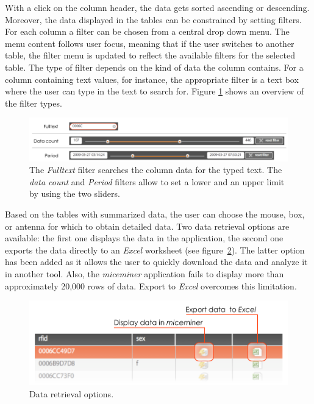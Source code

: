 With a click on the column header, the data gets sorted ascending or descending. Moreover, the data displayed in the tables can be constrained by setting filters. For each column a filter can be chosen from a central drop down menu. The menu content follows user focus, meaning that if the user switches to another table, the filter menu is updated to reflect the available filters for the selected table. The type of filter depends on the kind of data the column contains. For a column containing text values, for instance, the appropriate filter is a text box where the user can type in the text to search for. Figure \ref{fig:filter_types} shows an overview of the filter types.

\begin{figure}[ht]
\begin{center}
  \includegraphics[width=\textwidth]{assets/pdf/filter_types.pdf}
  \caption[Filter types]{The \textit{Fulltext} filter searches the column data for the typed text. The \textit{data count} and \textit{Period} filters allow to set a lower and an upper limit by using the two sliders.}
  \label{fig:filter_types}
\end{center}
\end{figure}

Based on the tables with summarized data, the user can choose the mouse, box, or antenna for which to obtain detailed data. Two data retrieval options are available: the first one displays the data in the application, the second one exports the data directly to an \textit{Excel} worksheet (see figure~\ref{fig:get_data_options}). The latter option has been added as it allows the user to quickly download the data and analyze it in another tool. Also, the \textit{miceminer} application fails to display more than approximately 20,000 rows of data. Export to \textit{Excel} overcomes this limitation.   

\begin{figure}[htbp]
\begin{center}
  \includegraphics[width=.75\textwidth]{assets/pdf/get_data_options.pdf}
  \caption[Data retrieval options]{Data retrieval options.}
  \label{fig:get_data_options}
\end{center}
\end{figure}

